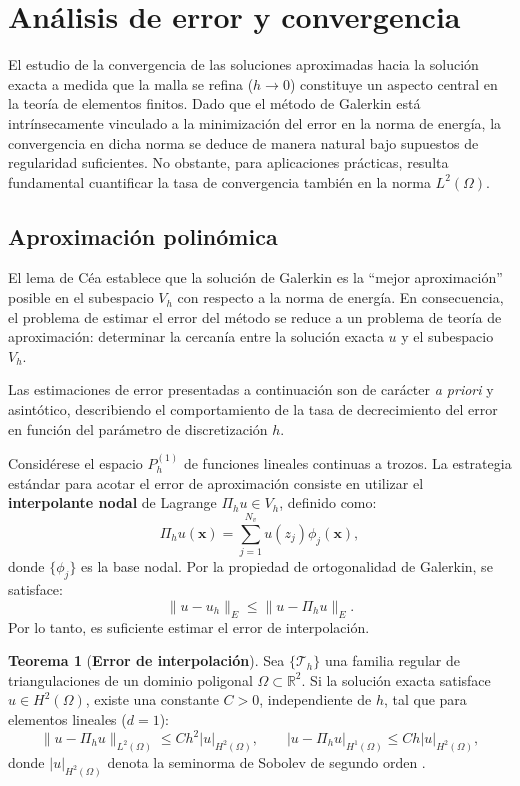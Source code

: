\documentclass[12pt, letterpaper]{report}
\theoremstyle{definition}
\newtheorem{teorema}{Teorema}[chapter]
\begin{document}
\section{Análisis de error y convergencia}

El estudio de la convergencia de las soluciones aproximadas hacia la solución exacta a medida que la malla se refina ($h \to 0$) constituye un aspecto central en la teoría de elementos finitos. Dado que el método de Galerkin está intrínsecamente vinculado a la minimización del error en la norma de energía, la convergencia en dicha norma se deduce de manera natural bajo supuestos de regularidad suficientes. No obstante, para aplicaciones prácticas, resulta fundamental cuantificar la tasa de convergencia también en la norma $L^2(\Omega)$.

\subsection{Aproximación polinómica}

El lema de Céa establece que la solución de Galerkin es la ``mejor aproximación'' posible en el subespacio $V_h$ con respecto a la norma de energía. En consecuencia, el problema de estimar el error del método se reduce a un problema de teoría de aproximación: determinar la cercanía entre la solución exacta $u$ y el subespacio $V_h$.

Las estimaciones de error presentadas a continuación son de carácter \emph{a priori} y asintótico, describiendo el comportamiento de la tasa de decrecimiento del error en función del parámetro de discretización $h$.

Considérese el espacio $P_h^{(1)}$ de funciones lineales continuas a trozos. La estrategia estándar para acotar el error de aproximación consiste en utilizar el \textbf{interpolante nodal} de Lagrange $\Pi_h u \in V_h$, definido como:
\begin{equation}\label{eq:interpolante}
    \Pi_h u(\mathbf{x}) = \sum_{j=1}^{N_v} u(z_j) \phi_j(\mathbf{x}),
\end{equation}
donde $\{\phi_j\}$ es la base nodal. Por la propiedad de ortogonalidad de Galerkin, se satisface:
\[
\|u - u_h\|_E \leq \|u - \Pi_h u\|_E.
\]
Por lo tanto, es suficiente estimar el error de interpolación.

\begin{teorema}[\textbf{Error de interpolación}]
    Sea $\{\mathcal{T}_h\}$ una familia regular de triangulaciones de un dominio poligonal $\Omega \subset \mathbb{R}^2$. Si la solución exacta satisface $u \in H^2(\Omega)$, existe una constante $C > 0$, independiente de $h$, tal que para elementos lineales ($d=1$):
    \[
    \|u - \Pi_h u\|_{L^2(\Omega)} \leq C h^2 |u|_{H^2(\Omega)},
    \qquad
    |u - \Pi_h u|_{H^1(\Omega)} \leq C h |u|_{H^2(\Omega)},
    \]
    donde $|u|_{H^2(\Omega)}$ denota la seminorma de Sobolev de segundo orden \cite{brenner2007mathematical}.
\end{teorema}
\end{document}
